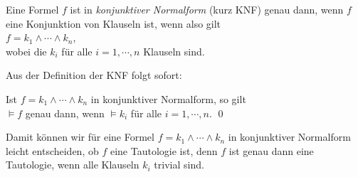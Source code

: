 \begin{Definition}  
  Eine Formel $f$ ist in \emph{\color{blue}konjunktiver Normalform} (kurz KNF)
  genau dann, wenn $f$ eine Konjunktion von Klauseln ist, wenn also gilt \\[0.2cm]
  \hspace*{1.3cm} $f = k_1 \wedge \cdots \wedge k_n$, \\[0.2cm]
  wobei die $k_i$ f\"{u}r alle $i=1,\cdots,n$ Klauseln sind. \eox
\end{Definition}

\noindent
Aus der Definition der KNF folgt sofort:
\begin{Korollar} \label{korollar:knf}
  Ist $f = k_1 \wedge \cdots \wedge k_n$ in konjunktiver Normalform, so gilt\\[0.2cm]
  \hspace*{1.3cm} $\models f$ \quad genau dann, wenn \quad $\models k_i$ \quad f\"{u}r alle $i=1,\cdots,n$. \qed
\end{Korollar}

Damit k\"{o}nnen wir f\"{u}r eine Formel $f = k_1 \wedge \cdots \wedge k_n$ in konjunktiver
Normalform leicht entscheiden, ob $f$ eine Tautologie ist, denn $f$ ist genau dann eine
Tautologie, wenn alle Klauseln $k_i$ trivial sind.
\vspace*{0.2cm}

